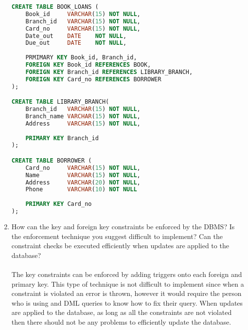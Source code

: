 \documentclass[12pt]{article}
\begin{document}
\begin{enumerate}
\begin{lstlisting}[language=sql]
CREATE TABLE BOOK_LOANS (
	Book_id		VARCHAR(15) NOT NULL,
	Branch_id	VARCHAR(15) NOT NULL,
	Card_no		VARCHAR(15) NOT NULL,
	Date_out	DATE 	NOT NULL,
	Due_out		DATE 	NOT NULL,
	
	PRMIMARY KEY Book_id, Branch_id,
	FOREIGN KEY Book_id REFERENCES BOOK,
	FOREIGN KEY Branch_id REFERENCES LIBRARY_BRANCH,
	FOREIGN KEY Card_no REFERENCES BORROWER
);

CREATE TABLE LIBRARY_BRANCH(
	Branch_id	VARCHAR(15) NOT NULL,
	Branch_name	VARCHAR(15) NOT NULL,
	Address		VARCHAR(15) NOT NULL,
	
	PRIMARY KEY Branch_id
);

CREATE TABLE BORROWER (
	Card_no		VARCHAR(15) NOT NULL,
	Name		VARCHAR(15) NOT NULL,
	Address 	VARCHAR(20) NOT NULL,
	Phone		VARCHAR(10) NOT NULL
	
	PRIMARY KEY Card_no
);
		\end{lstlisting}
		\pagebreak	
	
	\item How can the key and foreign key constraints be enforced by the DBMS? Is the enforcement technique you suggest difficult to implement? Can the constraint checks be executed efficiently when updates are applied to the database? \\ \\
	The key constraints can be enforced by adding triggers onto each foreign and primary key. This type of technique is not difficult to implement since when a constraint is violated an error is thrown, however it would require the person who is using and DML queries to know how to fix their query. When updates are applied to the database, as long as all the constraints are not violated then there should not be any problems to efficiently update the database.\\
	

\end{enumerate}
\end{document}

